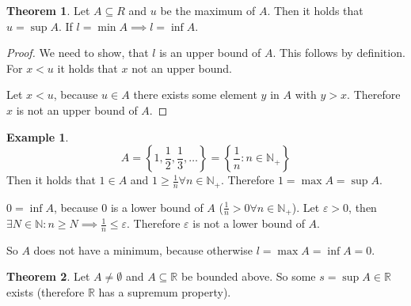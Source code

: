 \documentclass[a4paper,landscape,twocolumn]{article}
\theoremstyle{definition}
\newtheorem{theorem}{Theorem}
\newtheorem{ex}{Example}
\newcommand\set[1]{\left\{#1\right\}}
\begin{document}
\begin{theorem}
  Let $A \subseteq R$ and $u$ be the maximum of $A$. Then it holds that
  $u = \sup{A}$. If $l = \min{A} \implies l = \inf{A}$.
\end{theorem}

\begin{proof}
  We need to show, that $l$ is an upper bound of $A$.
  This follows by definition.
  For $x < u$ it holds that $x$ not an upper bound.

  Let $x < u$, because $u \in A$ there exists some element $y$ in $A$
  with $y > x$. Therefore $x$ is not an upper bound of $A$.
\end{proof}

\begin{ex}
  \[ A = \set{1, \frac12, \frac13, \ldots} = \set{\frac1n: n \in \mathbb N_+} \]
  Then it holds that $1 \in A$ and $1 \geq \frac1n \forall n \in \mathbb N_+$.
  Therefore $1 = \max{A} = \sup{A}$.

  $0 = \inf{A}$, because $0$ is a lower bound of $A$ ($\frac1n > 0 \forall n \in \mathbb N_+$).
  Let $\varepsilon > 0$, then $\exists N \in \mathbb N: n \geq N
  \implies \frac1n \leq \varepsilon$. Therefore $\varepsilon$ is not a lower bound of $A$.

  So $A$ does not have a minimum, because otherwise $l = \max{A} = \inf{A} = 0$.
\end{ex}

\begin{theorem}
  Let $A \neq \emptyset$ and $A \subseteq \mathbb R$ be bounded above.
  So some $s = \sup{A} \in \mathbb R$ exists (therefore $\mathbb R$ has a supremum property).
\end{theorem}
\end{document}
